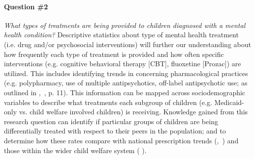 \documentclass[twocolumn, issue, rga, authordate]{jote-new-article}
\begin{document}
\paragraph{Question \#2} \emph{What types of treatments are being provided
to children diagnosed with a mental health condition?} Descriptive
statistics about type of mental health treatment (i.e. drug and/or
psychosocial interventions) will further our understanding about how
frequently each type of treatment is provided and how often specific
interventions (e.g. cognitive behavioral therapy {[}CBT{]}, fluoxetine
{[}Prozac{]}) are utilized. This includes identifying trends in
concerning pharmacological practices (e.g. polypharmacy, use of multiple
antipsychotics, off-label antipsychotic use; as outlined in ,~\citeyear{GovernmentAccountabilityOffice2012}, p. 11). This information can be mapped
across sociodemographic variables to describe what treatments each
subgroup of children (e.g. Medicaid-only vs. child welfare involved
children) is receiving. Knowledge gained from this research question can
identify if particular groups of children are being differentially
treated with respect to their peers in the population; and to determine
how these rates compare with national prescription trends (,~\citeyear{Olfson2002}) and those within the wider child
welfare system ( \citeyear{Raghavan2005}).

\vskip10pt
\end{document}

